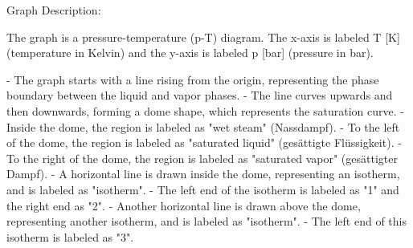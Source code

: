 Graph Description:

The graph is a pressure-temperature (p-T) diagram. The x-axis is labeled T [K] (temperature in Kelvin) and the y-axis is labeled p [bar] (pressure in bar).

- The graph starts with a line rising from the origin, representing the phase boundary between the liquid and vapor phases.
- The line curves upwards and then downwards, forming a dome shape, which represents the saturation curve.
- Inside the dome, the region is labeled as "wet steam" (Nassdampf).
- To the left of the dome, the region is labeled as "saturated liquid" (gesättigte Flüssigkeit).
- To the right of the dome, the region is labeled as "saturated vapor" (gesättigter Dampf).
- A horizontal line is drawn inside the dome, representing an isotherm, and is labeled as "isotherm".
- The left end of the isotherm is labeled as "1" and the right end as "2".
- Another horizontal line is drawn above the dome, representing another isotherm, and is labeled as "isotherm".
- The left end of this isotherm is labeled as "3".